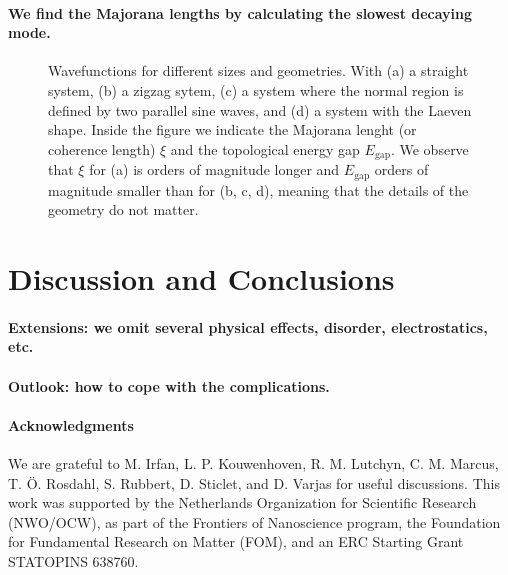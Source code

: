 \documentclass[english, twocolumn, 10pt, aps, superscriptaddress, floatfix, prb, citeautoscript]{revtex4-1}
\renewcommand{\comment}[2]{#2}
\renewcommand{\comment}{\paragraph}
\begin{document}
\comment{We find the Majorana lengths by calculating the slowest decaying mode.}

\begin{figure}
\caption{Wavefunctions for different sizes and geometries.
With (a) a straight system, (b) a zigzag sytem, (c) a system where the normal region is defined by two parallel sine waves, and (d) a system with the Laeven shape.
Inside the figure we indicate the Majorana lenght (or coherence length) $\xi$ and the topological energy gap $E_\textrm{gap}.$
We observe that $\xi$ for (a) is orders of magnitude longer and $E_\textrm{gap}$ orders of magnitude smaller than for (b, c, d), meaning that the details of the geometry do not matter.
\label{fig:wavefunctions}}
\end{figure}


\section{Discussion and Conclusions}

\comment{Extensions: we omit several physical effects, disorder, electrostatics, etc.}

\comment{Outlook: how to cope with the complications.}

\comment{Acknowledgments}

We are grateful to M. Irfan, L. P. Kouwenhoven, R. M. Lutchyn, C. M. Marcus, T. Ö. Rosdahl, S. Rubbert, D. Sticlet, and D. Varjas for useful discussions.
This work was supported by the Netherlands Organization for Scientific Research (NWO/OCW), as part of the Frontiers of Nanoscience program, the Foundation for Fundamental Research on Matter (FOM), and an ERC Starting Grant STATOPINS 638760.



\end{document}
